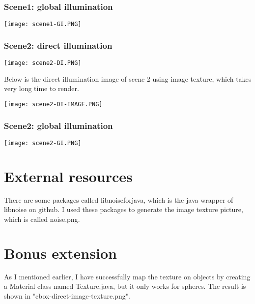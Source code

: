 \documentclass[a4paper, 11pt]{article}
\begin{document}
        \subsubsection{Scene1: global illumination}
            \begin{center}
                \texttt{[image: scene1-GI.PNG]}
            \end{center}
        \subsubsection{Scene2: direct illumination}
            \begin{center}
                \texttt{[image: scene2-DI.PNG]}
            \end{center}
            Below is the direct illumination image of scene 2 using image texture, which takes very long time to render.
            \begin{center}
                \texttt{[image: scene2-DI-IMAGE.PNG]}
            \end{center}
        \subsubsection{Scene2: global illumination}
            \begin{center}
                \texttt{[image: scene2-GI.PNG]}
            \end{center}

\section*{External resources}
    \indent There are some packages called libnoiseforjava, which is the java wrapper of libnoise on github. I used these packages to generate the image texture picture, which is called noise.png.

\section*{Bonus extension}
    \indent As I mentioned earlier, I have successfully map the texture on objects by creating a Material class named Texture.java, but it only works for spheres. The result is shown in "cbox-direct-image-texture.png".
\end{document}
